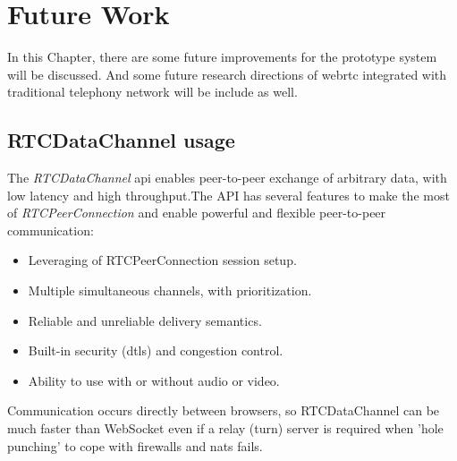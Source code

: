 \chapter{Future Work}
\label{chp:future_work}

\noindent In this Chapter, there are some future improvements for the prototype system will be discussed. And some future research directions of \gls{webrtc} integrated with traditional telephony network will be include as well.

\section{RTCDataChannel usage}

\par The \textit{RTCDataChannel} \gls{api} enables peer-to-peer exchange of arbitrary data, with low latency and high throughput.The API has several features to make the most of \textit{RTCPeerConnection} and enable powerful and flexible peer-to-peer communication\cite{html5rock:webrtc}:

\begin{itemize}[topsep=-1em,parsep=0em,itemsep=0em]
    \item Leveraging of RTCPeerConnection session setup.
    \item Multiple simultaneous channels, with prioritization.
    \item Reliable and unreliable delivery semantics.
    \item Built-in security (\gls{dtls}) and congestion control.
    \item Ability to use with or without audio or video.
\end{itemize}

\par Communication occurs directly between browsers, so RTCDataChannel can be much faster than WebSocket even if a relay (\gls{turn}) server is required when 'hole punching' to cope with firewalls and \gls{nat}s fails.


